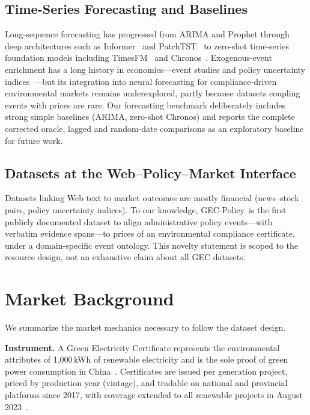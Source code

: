 \documentclass[sigconf,anonymous,review]{acmart}
\newcommand{\dataset}{GEC-Policy\xspace}
\begin{document}
\subsection{Time-Series Forecasting and Baselines}
Long-sequence forecasting has progressed from ARIMA and Prophet through deep architectures such as Informer~\cite{informer2021} and PatchTST~\cite{patchtst2023} to zero-shot time-series foundation models including TimesFM~\cite{timesfm2024} and Chronos~\cite{chronos2024}. Exogenous-event enrichment has a long history in economics---event studies and policy uncertainty indices~\cite{epu2016}---but its integration into neural forecasting for compliance-driven environmental markets remains underexplored, partly because datasets coupling events with prices are rare. Our forecasting benchmark deliberately includes strong simple baselines (ARIMA, zero-shot Chronos) and reports the complete corrected oracle, lagged and random-date comparisons as an exploratory baseline for future work.

\subsection{Datasets at the Web--Policy--Market Interface}
Datasets linking Web text to market outcomes are mostly financial (news--stock pairs, policy uncertainty indices). To our knowledge, \dataset\ is the first publicly documented dataset to align administrative policy events---with verbatim evidence spans---to prices of an environmental compliance certificate, under a domain-specific event ontology. This novelty statement is scoped to the resource design, not an exhaustive claim about all GEC datasets.

\section{Market Background}
\label{sec:background}

We summarize the market mechanics necessary to follow the dataset design.

\textbf{Instrument.} A Green Electricity Certificate represents the environmental attributes of 1{,}000\,kWh of renewable electricity and is the sole proof of green power consumption in China~\cite{gec2023fullcoverage}. Certificates are issued per generation project, priced by production year (vintage), and tradable on national and provincial platforms since 2017, with coverage extended to all renewable projects in August 2023~\cite{gec2023fullcoverage}.
\end{document}
